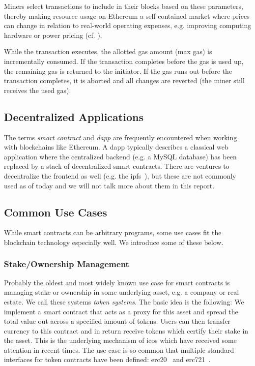 Miners select transactions to include in their blocks based on these parameters,
thereby making resource usage on Ethereum a self-contained market where prices can change
in relation to real-world operating expenses, e.g. improving computing hardware or power pricing (cf. \cite{Aggarwal17}).

While the transaction executes, the allotted gas amount (max gas) is incrementally consumed.
If the transaction completes before the gas is used up, the remaining gas is returned
to the initiator. If the gas runs out before the transaction completes, it is aborted
and all changes are reverted (the miner still receives the used gas). 

\subsection{Decentralized Applications}

The terms \emph{smart contract} and \emph{\ac{dapp}} are frequently encountered when working with
blockchains like Ethereum.
A \ac{dapp} typically describes a classical web application where the
centralized backend (e.g. a MySQL database) has been replaced by a stack of decentralized
smart contracts.
There are ventures to decentralize the frontend as well (e.g. the  \ac{ipfs}~\cite{Benet14}),
but these are not commonly used as of today and we will not talk more about them in this report.

\subsection{Common Use Cases}

While smart contracts can be arbitrary programs,
some use cases fit the blockchain technology especially well.
We introduce some of these below.

\subsubsection{Stake/Ownership Management}

Probably the oldest and most widely known use case for smart contracts is managing
stake or ownership in some underlying asset, e.g. a company or real estate.
We call these systems \emph{token systems}. The basic idea is the following: We implement a smart
contract that acts as a proxy for this asset and spread the total value out across
a specified amount of tokens. Users can then transfer currency to this contract and
in return receive tokens which certify their stake in the asset.
This is the underlying mechanism of \acp{ico} which have received some attention in recent times.
The use case is so common that multiple standard interfaces for token contracts have been defined:
\acs{erc}20~\cite{Vogelsteller15} and \acs{erc}721~\cite{Entriken18}.

